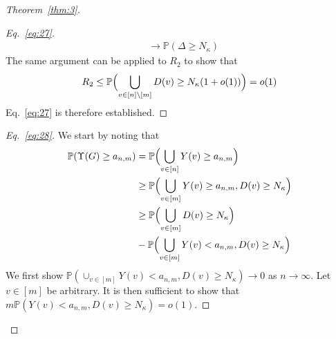 \documentclass[draftcls]{IEEEtran}
\theoremstyle{definition}
\begin{document}
\begin{proof}[Theorem~\ref{thm:3}]
\begin{proof}[Eq.~\eqref{eq:27}]
\begin{equation}
\begin{split}
    & \rightarrow \mathbb{P}(\Delta \geq N_{\kappa})
    \end{split}
\end{equation}
The same argument can be applied to $R_2$ to show that
\begin{equation}
  \label{eq:38}
  R_2 \leq \mathbb{P}\Bigl(\bigcup_{v \in [n] \setminus [m]} D(v) \geq
  N_{\kappa}(1 + o(1))\Bigr) = o(1)
\end{equation}
Eq.~\eqref{eq:27} is therefore established.
\end{proof}
\begin{proof}[Eq.~\eqref{eq:28}]
  We start by noting that
  \begin{equation*}
    \begin{split}
      \mathbb{P}(\Upsilon(G) \geq a_{n,m}) &=
      \mathbb{P}\Bigl(\bigcup_{v \in [n]}Y(v) \geq
      a_{n,m}\Bigr) \\
      & \geq \mathbb{P}\Bigl(\bigcup_{v \in [m]}Y(v) \geq
      a_{n,m}, D(v) \geq N_\kappa \Bigr) \\
      & \geq \mathbb{P}\Bigl(\bigcup_{v \in [m]} D(v) \geq
      N_\kappa\Bigr) \\ &- \mathbb{P}\Bigl( \bigcup_{v
        \in [m]} Y(v) < a_{n,m}, D(v) \geq N_\kappa\Bigr)
    \end{split}
  \end{equation*}
  We first show $\mathbb{P}( \cup_{v
        \in [m]} Y(v) < a_{n,m}, D(v) \geq N_\kappa) \rightarrow 0$ as
      $n \rightarrow \infty$. Let $v \in [m]$ be arbitrary. It is then
      sufficient to show that $m\mathbb{P}(Y(v) < a_{n,m}, D(v) \geq
      N_{\kappa}) = o(1)$. 
\end{proof}

\end{proof}

\end{document}
